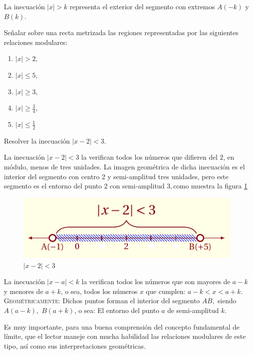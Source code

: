\documentclass[oneside,english,spanish,2m,twoside,svgnames,x11names,HTML,twoside,12pt]{libro-matua}\usepackage[]{graphicx}\usepackage[]{color}
\newcommand{\noun}[1]{\textsc{#1}}
\newcommand{\val}[1]{\left|#1\right|}
\begin{document}
\general La inecuación $\val{x}>k$ representa el exterior del segmento
con extremos $A\left(-k\right)$ y $B\left(k\right).$ 

\begin{ejercicios}[] Señalar sobre una recta metrizada las regiones
representadas por las siguientes relaciones modulares:
\begin{enumerate}
\item $\val{x}>2,$
\item $\val{x}\leq5,$
\item $\val{x}\geq3,$
\item $\val{x}\geq\frac{3}{4},$
\item $\val{x}\leq\frac{1}{2}$
\end{enumerate}
\end{ejercicios}

\begin{ejemplo}\label{ej:ejem5cv}

Resolver la inecuación $\val{x-2}<3.$

\end{ejemplo}

\sol La inecuación $\val{x-2}<3$ la verifican todos los números
que difieren del $2$, en módulo, menos de tres unidades. La imagen
geométrica de dicha inecuación es el interior del segmento con centro
$2$ y semi-amplitud tres unidades, pero este segmento es el entorno
del punto $2$ con semi-amplitud $3,$como muestra la figura \ref{fig:cal_lim5}
\begin{figure}[H]
\centering\includegraphics{7_home_antalcides_MEGA_calculo_I_libro_pdf_cal_lim5.pdf}\caption{$\val{x-2}< 3$}\label{fig:cal_lim5}
\end{figure}
\fin

\general La inecuación $\val{x-a}<k$ la verifican todos los números
que son mayores de $a-k$ y menores de $a+k$, o sea, todos los números
$x$ que cumplen: $a-k<x<a+k.$ \noun{Geométricamente:} Dichos puntos
forman el interior del segmento $AB,$ siendo $A\left(a-k\right),$
$B\left(a+k\right)$, o sea: El entorno del punto $a$ de semi-amplitud
$k.$

\begin{nota}\peque

Es muy importante, para una buena comprensión del concepto fundamental
de límite, que el lector maneje con mucha habilidad las relaciones
modulares de este tipo, así como sus interpretaciones geométricas. 

\end{nota}
\end{document}
